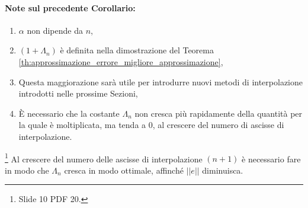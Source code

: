 \paragraph{Note sul precedente Corollario:}
\begin{enumerate}
	\item $\alpha$ non dipende da $n$,
	\item $(1 + \Lambda_n)$ è definita nella dimostrazione del Teorema \ref{th:approssimazione_errore_migliore_approssimazione},
	\item Questa maggiorazione sarà utile per introdurre nuovi metodi di interpolazione introdotti nelle prossime Sezioni,
	\item È necessario che la costante $\Lambda_n$ non cresca più rapidamente della quantità per la quale è moltiplicata, ma tenda a 0, al crescere del numero di ascisse di interpolazione.
\end{enumerate}

\begin{remark}\footnote{Slide 10 PDF 20.}
    Al crescere del numero delle ascisse di interpolazione $(n+1)$ è necessario fare in modo che $\Lambda_n$ cresca in modo ottimale, affinché $||e||$ diminuisca.
\end{remark}

